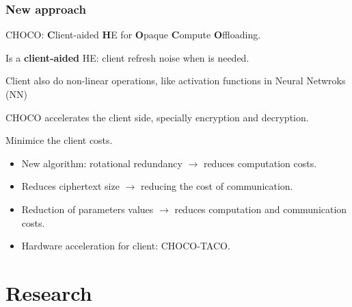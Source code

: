 \documentclass[10pt,handout]{beamer}
\begin{document}
\begin{frame}
\frametitle{New approach}

CHOCO: \textbf{C}lient-aided \textbf{H}E for \textbf{O}paque \textbf{C}ompute \textbf{O}ffloading.

    Is a \textbf{client-aided} HE: client refresh noise when is needed.

    Client also do non-linear operations, like activation functions in Neural Netwroks (NN)

     CHOCO accelerates the client side, specially encryption and decryption.

    Minimice the client costs.
\begin{itemize}\itemsep-0.7em
        \item New algorithm: rotational redundancy $\rightarrow$ reduces computation costs.
    \item Reduces ciphertext size $\rightarrow$ reducing the cost of communication.
    \item Reduction of parameters values $\rightarrow$ reduces computation and communication costs.
    \item Hardware acceleration for client: CHOCO-TACO.
\end{itemize}
\end{frame}



\section{Research}
\end{document}
